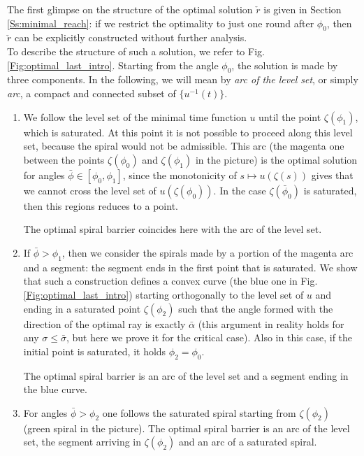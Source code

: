 \documentclass[reqno]{amsart}
\theoremstyle{definition} \newtheorem{definition}{Definition}[section]
\theoremstyle{definition} \newtheorem{remark}[definition]{Remark}
\theoremstyle{plain} \newtheorem{lemma}[definition]{Lemma}
\theoremstyle{plain} \newtheorem{proposition}[definition]{Proposition}
\theoremstyle{plain} \newtheorem{theorem}[definition]{Theorem}
\theoremstyle{plain} \newtheorem{corollary}[definition]{Corollary}
\theoremstyle{definition} \newtheorem{example}[definition]{Example}
\theoremstyle{plain} \newtheorem{claim}[clai]{Claim}
\theoremstyle{definition} \newtheorem{assumption}[definition]{Assumption}
\theoremstyle{definition} \newtheorem{observation}[definition]{Observation}
\newcommand{\1}{\mathbbm 1}
\numberwithin{equation}{section} %
\theoremstyle{plain} \newtheorem*{theorem*}{Theorem}
\theoremstyle{plain} \newtheorem{mthm}[maintheorem]{Main Theorem}
\theoremstyle{plain} \newtheorem*{mthm*}{Main Theorem}
\theoremstyle{plain} \newtheorem*{conjecture*}{Conjecture}
\theoremstyle{plain} \newtheorem{conjecture}[definition]{Conjecture}
\theoremstyle{plain} \newtheorem*{problem*}{Problem}
\begin{document}
The first glimpse on the structure of the optimal solution $\check r$ is given in Section \ref{Ss:minimal_reach}: if we restrict the optimality to just one round after $\phi_0$, then $\check r$ can be explicitly constructed without further analysis. \\
To describe the structure of such a solution, we refer to Fig. \ref{Fig:optimal_last_intro}. Starting from the angle $\phi_0$, the solution is made by three components. In the following, we will mean by \emph{arc of the level set}, or simply \emph{arc}, a compact and connected subset of $\lbrace u^{-1}(t)\rbrace$.
\begin{enumerate}
\item We follow the level set of the minimal time function $u$ until the point $\zeta(\phi_1)$, which is saturated. At this point it is not possible to proceed along this level set, because the spiral would not be admissible. This arc (the magenta one between the points $\zeta(\phi_0)$ and $\zeta(\phi_1)$ in the picture) is the optimal solution for angles $\bar \phi \in [\phi_0,\phi_1]$, since the monotonicity of $s \mapsto u(\zeta(s))$ gives that we cannot cross the level set of $u(\zeta(\phi_0))$. In the case $\zeta(\bar \phi_0)$ is saturated, then this regions reduces to a point.

The optimal spiral barrier coincides here with the arc of the level set.

\item If $\bar \phi > \phi_1$, then we consider the spirals made by a portion of the magenta arc and a segment: the segment ends in the first point that is saturated. We show that such a construction defines a convex curve (the blue one in Fig. \ref{Fig:optimal_last_intro}) starting orthogonally to the level set of $u$ and ending in a saturated point $\zeta(\phi_2)$ such that the angle formed with the direction of the optimal ray is exactly $\bar \alpha$ (this argument in reality holds for any $\sigma\leq\bar\sigma$, but here we prove it for the critical case). Also in this case, if the initial point is saturated, it holds $\phi_2 = \phi_0$.

The optimal spiral barrier is an arc of the level set and a segment ending in the blue curve.

\item For angles $\bar \phi > \phi_2$ one follows the saturated spiral starting from $\zeta(\phi_2)$ (green spiral in the picture). The optimal spiral barrier is an arc of the level set, the segment arriving in $\zeta(\phi_2)$ and an arc of a saturated spiral.
\end{enumerate}
\end{document}

